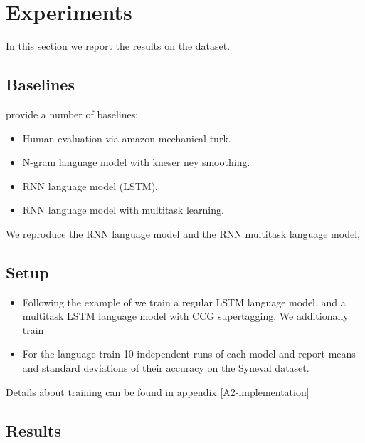 

\section{Experiments}

In this section we report the results on the dataset.

\subsection{Baselines}
\citet{linzen2018targeted} provide a number of baselines:
\begin{itemize}
  \item Human evaluation via amazon mechanical turk.
  \item N-gram language model with kneser ney smoothing.
  \item RNN language model (LSTM).
  \item RNN language model with multitask learning.
\end{itemize}
We reproduce the RNN language model and the RNN multitask language model,

\subsection{Setup}
\begin{itemize}
  \item Following the example of \citet{linzen2018targeted} we train a regular LSTM language model, and a multitask LSTM language model with CCG supertagging. We additionally train
  \item For the language train 10 independent runs of each model and report means and standard deviations of their accuracy on the Syneval dataset.
\end{itemize}

Details about training can be found in appendix \ref{A2-implementation}

\subsection{Results}
